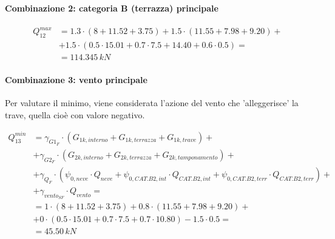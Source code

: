 \paragraph{Combinazione 2: categoria B (terrazza) principale}

\begin{align*}
	Q_{12}^{max} &= 1.3\cdot(8+11.52 + 3.75) 
	+1.5\cdot(11.55+7.98 + 9.20) +\\
	&+1.5\cdot(0.5\cdot 15.01 + 0.7\cdot7.5+ 14.40 + 0.6\cdot 0.5) = \\
	&= 	114.345\,kN
\end{align*}

\paragraph{Combinazione 3: vento principale}
Per valutare il minimo, viene considerata l'azione del vento che 'alleggerisce' la trave, quella cioè con valore negativo.

\begin{align*}
	Q_{13}^{min} &=\gamma_{G1_{F}}\cdot\left( G_{1k, interno} + G_{1k, terrazza} + G_{1k, trave} \right) +\\
	&+\gamma_{G2_{F}}\cdot\left( G_{2k, interno} + G_{2k, terrazza} + G_{2k, tamponamento} \right) +\\
	&+\gamma_{Q_{F}}\cdot (\psi_{0,neve}\cdot Q_{neve} + \psi_{0,CAT.B2,int}\cdot Q_{CAT.B2,int} + \psi_{0,CAT.B2,terr}\cdot Q_{CAT.B2,terr}) +\\
	&+ \gamma_{vento_{SF}}\cdot Q_{vento} =\\
	&= 1\cdot(8+11.52 + 3.75) +0.8 \cdot(11.55+7.98 + 9.20) +\\
	&+ 0\cdot(0.5\cdot 15.01 + 0.7\cdot7.5+ 0.7\cdot 10.80) - 1.5\cdot 0.5 = \\
	&= 	45.50\,kN
\end{align*}


